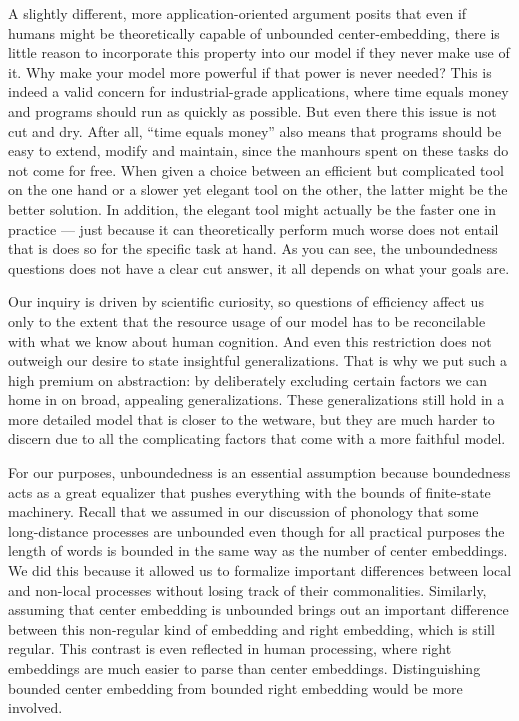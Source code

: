 A slightly different, more application-oriented argument posits that even if humans might be theoretically capable of unbounded center-embedding, there is little reason to incorporate this property into our model if they never make use of it.
Why make your model more powerful if that power is never needed?
This is indeed a valid concern for industrial-grade applications, where time equals money and programs should run as quickly as possible.
But even there this issue is not cut and dry.
After all, ``time equals money'' also means that programs should be easy to extend, modify and maintain, since the manhours spent on these tasks do not come for free.
When given a choice between an efficient but complicated tool on the one hand or a slower yet elegant tool on the other, the latter might be the better solution.
%
In addition, the elegant tool might actually be the faster one in practice --- just because it can theoretically perform much worse does not entail that is does so for the specific task at hand.
As you can see, the unboundedness questions does not have a clear cut answer, it all depends on what your goals are.

Our inquiry is driven by scientific curiosity, so questions of efficiency affect us only to the extent that the resource usage of our model has to be reconcilable with what we know about human cognition.
And even this restriction does not outweigh our desire to state insightful generalizations.
That is why we put such a high premium on abstraction: by deliberately excluding certain factors we can home in on broad, appealing generalizations.
These generalizations still hold in a more detailed model that is closer to the wetware, but they are much harder to discern due to all the complicating factors that come with a more faithful model.

For our purposes, unboundedness is an essential assumption because boundedness acts as a great equalizer that pushes everything with the bounds of finite-state machinery.
Recall that we assumed in our discussion of phonology that some long-distance processes are unbounded even though for all practical purposes the length of words is bounded in the same way as the number of center embeddings.
We did this because it allowed us to formalize important differences between local and non-local processes without losing track of their commonalities.
Similarly, assuming that center embedding is unbounded brings out an important difference between this non-regular kind of embedding and right embedding, which is still regular.
This contrast is even reflected in human processing, where right embeddings are much easier to parse than center embeddings.
Distinguishing bounded center embedding from bounded right embedding would be more involved. 

